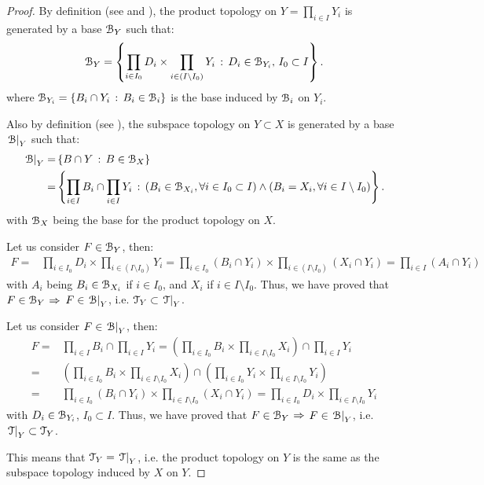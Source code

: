 \begin{proof}
	By definition (see  and ), the product topology on $Y=\prod_{i\in I}Y_i$ is generated by a base $\EuScript{B}_Y$ such that:
	$$
	\EuScript{B}_Y=\left\{\prod_{i\in I_0}D_i\times \prod_{i\in(I\setminus I_0)}Y_i\,:\,D_i\in\EuScript{B}_{Y_i},\,I_0\subset I\right\}.
	$$
	where $\EuScript{B}_{Y_i}=\left\{B_i\cap Y_i\,:\,B_i\in \EuScript{B}_i\right\}$ is the base induced by $\EuScript{B}_i$ on $Y_i$.

	Also by definition (see ), the subspace topology on $Y\subset X$ is generated by a base $\left.\EuScript{B}\right|_{Y}$ such that:
	\begin{align*}
	\left.\EuScript{B}\right|_{Y}=&\left\{B\cap Y\,:\,B\in\EuScript{B}_X\right\}\\
	=&\left\{\prod_{i\in I}B_i\cap \prod_{i\in I}Y_i\,:\,\left(B_i\in\EuScript{B}_{X_i},\forall i\in I_0\subset I\right)\land\left(B_i=X_i, \forall i\in I\setminus I_0\right)\right\}.
	\end{align*}
	with $\EuScript{B}_X$ being the base for the product topology on $X$.

	\noindent{\boxed{\subseteq}} Let us consider $F\in \EuScript{B}_{Y}$, then:
	\begin{align*}
	F=&\prod_{i\in I_0} D_i \times \prod_{i\in(I\setminus I_0)}Y_i=\prod_{i\in I_0} (B_i\cap Y_i) \times \prod_{i\in(I\setminus I_0)}(X_i\cap Y_i)=\prod_{i\in I}(A_i\cap Y_i)
	\end{align*}
	with $A_i$ being $B_i\in \EuScript{B}_{X_i}$ if $i\in I_0$, and $X_i$ if $i\in I\setminus I_0$.
	Thus, we have proved that $F\in\EuScript{B}_Y$ $\Rightarrow$ $F\in\left.\EuScript{B}\right|_{Y}$, i.e. $\EuScript{T}_Y\subset \left.\EuScript{T}\right|_{Y}$.

	\noindent{\boxed{\supseteq}} Let us consider $F\in \left.\EuScript{B}\right|_{Y}$, then:
	\begin{align*}
		F=&\prod_{i\in I}B_i\cap \prod_{i\in I}Y_i = \left(\prod_{i\in I_0} B_i\times \prod_{i\in I\setminus I_0} X_i\right)\cap \prod_{i\in I}Y_i\\
		=&\left(\prod_{i\in I_0} B_i\times \prod_{i\in I\setminus I_0} X_i\right)\cap \left(\prod_{i\in I_0} Y_i\times \prod_{i\in I\setminus I_0} Y_i\right)\\
		=&\prod_{i\in I_0} (B_i\cap Y_i) \times \prod_{i\in I\setminus I_0} (X_i\cap Y_i) = \prod_{i\in I_0} D_i \times \prod_{i\in I\setminus I_0} Y_i
	\end{align*}
	with $D_i\in \EuScript{B}_{Y_i}$, $I_0\subset I$. Thus, we have proved that $F\in \EuScript{B}_Y$ $\Rightarrow$ $F\in \left.\EuScript{B}\right|_{Y}$, i.e. $\left.\EuScript{T}\right|_{Y}\subset \EuScript{T}_Y$.

	This means that $\EuScript{T}_Y=\left.\EuScript{T}\right|_{Y}$, i.e. the product topology on $Y$ is the same as the subspace topology induced by $X$ on $Y$.
\end{proof}


